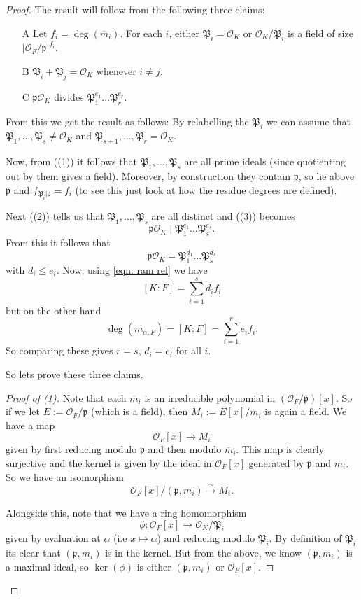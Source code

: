 \documentclass[11pt,a4paper]{report}
\theoremstyle{plain}
\theoremstyle{definition}
\theoremstyle{definition}
\def \gothP{\mathfrak{P}}
\def\gothp{\mathfrak{p}}
\def \a{\alpha}
\def \OO {\mathcal{O}}
\def \ov{\overline}
\def \lra{\longrightarrow}
\begin{document}
	\begin{proof}
		The result will  follow from the following three claims:
		\begin{enumerate}[(A)]
			\item[A] Let $f_i=\deg(\ov{m}_i)$. For each $i$, either  $\gothP_i=\OO_K$ or $\OO_K/\gothP_i$ is a field of size $|\OO_F/\gothp|^{f_i}$.
			\item[B] $\gothP_i+\gothP_j=\OO_K$ whenever $i \neq j$.
			\item [C] $\gothp\OO_K$ divides $\gothP_1^{e_1}\dots\gothP_r^{e_r}$.
		\end{enumerate}
		
		From this we get the result as follows: By relabelling the $\gothP_i$ we can assume that  $\gothP_1,\dots,\gothP_s \neq \OO_K$ and $\gothP_{s+1},\dots,\gothP_r=\OO_K$. 
		
		Now, from ((1)) it follows that  $\gothP_1,\dots,\gothP_s$ are all prime ideals (since quotienting out by them gives a field). Moreover, by construction they contain $\gothp$, so lie above $\gothp$ and $f_{\gothP_i|\gothp}=f_i$ (to see this just look at how the residue degrees are defined).
		
		Next ((2)) tells us that  $\gothP_1,\dots,\gothP_s$ are all distinct and ((3)) becomes \[\gothp\OO_K \mid \gothP_1^{e_1}\dots\gothP_s^{e_s}.\] From this it follows that \[\gothp\OO_K = \gothP_1^{d_1}\dots\gothP_s^{d_s}\] with $d_i \leq e_i$. Now, using \ref{eqn: ram rel} we have \[[K:F]=\sum_{i=1}^s d_if_i\] but on the other hand \[\deg(m_{\a,F})=[K:F]=\sum_{i=1}^r e_if_i.\] So comparing these gives $r=s$, $d_i=e_i$ for all $i$.
		
		So lets prove these three claims.
		
		\begin{proof}[Proof of (1)]
			Note that each $\ov{m}_i$ is an irreducible polynomial in $(\OO_F/\gothp)[x]$. So if we let $E:=\OO_F/\gothp$ (which is a field), then $M_i:=E[x]/\ov{m}_i$ is again a field. We have a map \[\OO_F[x] \lra M_i\] given by first reducing modulo $\gothp$ and then modulo $\ov{m}_i$. This map is clearly surjective and the kernel is given by the ideal in $\OO_F[x]$ generated by $\gothp$ and $m_i$. So we have an isomorphism \[\OO_F[x]/(\gothp,m_i) \overset{\sim}{\lra} M_i.\]
			
			Alongside this, note that we have a ring homomorphism \[\phi:\OO_F[x] \lra \OO_K/\gothP_i\] given by evaluation at $\a$  (i.e $x \mapsto \a$) and reducing modulo $\gothP_i$. By definition of $\gothP_i$ its clear that $(\gothp,m_i)$ is in the kernel. But from the above, we know $(\gothp,m_i)$ is a maximal ideal, so $\ker(\phi)$ is either $(\gothp,m_i)$ or $\OO_F[x]$.
			

\end{proof}
\end{proof}
\end{document}
